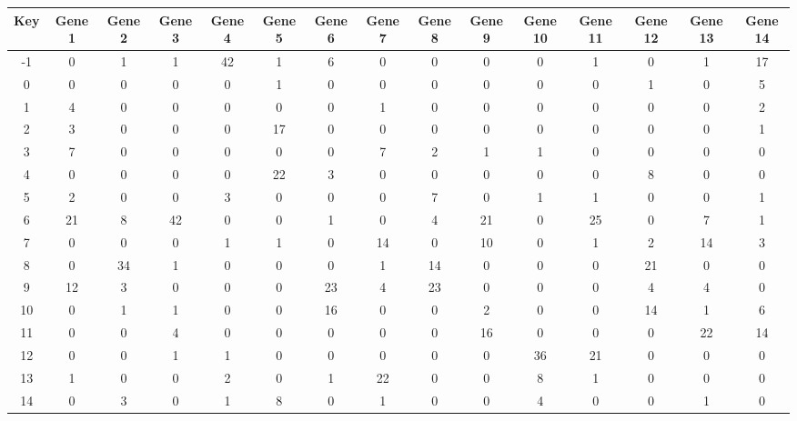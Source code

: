 \begin{tabular}{|c|c|c|c|c|c|c|c|c|c|c|c|c|c|c|}
\hline
Key & Gene 1 & Gene 2 & Gene 3 & Gene 4 & Gene 5 & Gene 6 & Gene 7 & Gene 8 & Gene 9 & Gene 10 & Gene 11 & Gene 12 & Gene 13 & Gene 14 \\
\hline
-1 & 0 & 1 & 1 & 42 & 1 & 6 & 0 & 0 & 0 & 0 & 1 & 0 & 1 & 17 \\
0 & 0 & 0 & 0 & 0 & 1 & 0 & 0 & 0 & 0 & 0 & 0 & 1 & 0 & 5 \\
1 & 4 & 0 & 0 & 0 & 0 & 0 & 1 & 0 & 0 & 0 & 0 & 0 & 0 & 2 \\
2 & 3 & 0 & 0 & 0 & 17 & 0 & 0 & 0 & 0 & 0 & 0 & 0 & 0 & 1 \\
3 & 7 & 0 & 0 & 0 & 0 & 0 & 7 & 2 & 1 & 1 & 0 & 0 & 0 & 0 \\
4 & 0 & 0 & 0 & 0 & 22 & 3 & 0 & 0 & 0 & 0 & 0 & 8 & 0 & 0 \\
5 & 2 & 0 & 0 & 3 & 0 & 0 & 0 & 7 & 0 & 1 & 1 & 0 & 0 & 1 \\
6 & 21 & 8 & 42 & 0 & 0 & 1 & 0 & 4 & 21 & 0 & 25 & 0 & 7 & 1 \\
7 & 0 & 0 & 0 & 1 & 1 & 0 & 14 & 0 & 10 & 0 & 1 & 2 & 14 & 3 \\
8 & 0 & 34 & 1 & 0 & 0 & 0 & 1 & 14 & 0 & 0 & 0 & 21 & 0 & 0 \\
9 & 12 & 3 & 0 & 0 & 0 & 23 & 4 & 23 & 0 & 0 & 0 & 4 & 4 & 0 \\
10 & 0 & 1 & 1 & 0 & 0 & 16 & 0 & 0 & 2 & 0 & 0 & 14 & 1 & 6 \\
11 & 0 & 0 & 4 & 0 & 0 & 0 & 0 & 0 & 16 & 0 & 0 & 0 & 22 & 14 \\
12 & 0 & 0 & 1 & 1 & 0 & 0 & 0 & 0 & 0 & 36 & 21 & 0 & 0 & 0 \\
13 & 1 & 0 & 0 & 2 & 0 & 1 & 22 & 0 & 0 & 8 & 1 & 0 & 0 & 0 \\
14 & 0 & 3 & 0 & 1 & 8 & 0 & 1 & 0 & 0 & 4 & 0 & 0 & 1 & 0 \\
\hline
\end{tabular}